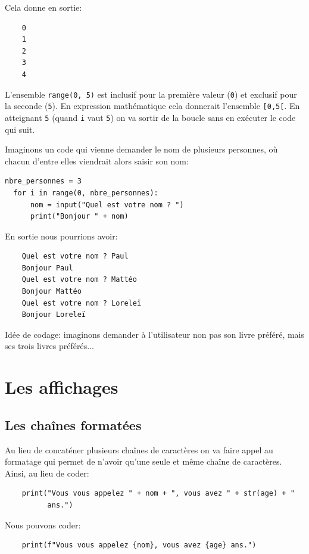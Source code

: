 \documentclass[a4paper,12pt]{book}
\begin{document}
Cela donne en sortie:
\begin{verbatim}
    0
    1
    2
    3
    4
\end{verbatim}
\medskip

L'ensemble \texttt{range(0, 5)} est inclusif pour la première valeur (\texttt{0}) et exclusif pour la seconde (\texttt{5}). En expression mathématique cela donnerait l'ensemble \texttt{[0,5[}. En atteignant \texttt{5} (quand \texttt{i} vaut \texttt{5}) on va sortir de la boucle sans en exécuter le code qui suit.
\medskip

Imaginons un code qui vienne demander le nom de plusieurs personnes, où chacun d'entre elles viendrait alors saisir son nom:
\begin{lstlisting}[caption=Demander trois fois le nom]
  nbre_personnes = 3
  for i in range(0, nbre_personnes):
  	  nom = input("Quel est votre nom ? ")
  	  print("Bonjour " + nom)
\end{lstlisting}
\medskip

En sortie nous pourrions avoir:
\begin{verbatim}
    Quel est votre nom ? Paul
    Bonjour Paul
    Quel est votre nom ? Mattéo
    Bonjour Mattéo
    Quel est votre nom ? Loreleï
    Bonjour Loreleï
\end{verbatim}
\medskip

Idée de codage: imaginons demander à l'utilisateur non pas son livre préféré, mais ses trois livres préférés...
\medskip

\chapter{Les affichages}
\section{Les chaînes formatées}
Au lieu de concaténer plusieurs chaînes de caractères on va faire appel au formatage qui permet de n'avoir qu'une seule et même chaîne de caractères. Ainsi, au lieu de coder:
\begin{verbatim}
    print("Vous vous appelez " + nom + ", vous avez " + str(age) + " 
          ans.")
\end{verbatim}
\medskip

Nous pouvons coder:
\begin{verbatim}
    print(f"Vous vous appelez {nom}, vous avez {age} ans.")
\end{verbatim}
\medskip
\end{document}
